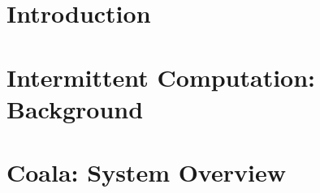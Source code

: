 \documentclass[sigplan,10pt,review,anonymous]{acmart}
\newcommand{\sys}{Coala\xspace}
\begin{document}



\maketitle

\section{Introduction}
\label{sec:intro}



\section{Intermittent Computation: Background}
\label{sec:background}



\section{\sys: System Overview}
\label{sec:overall_system}
\end{document}
